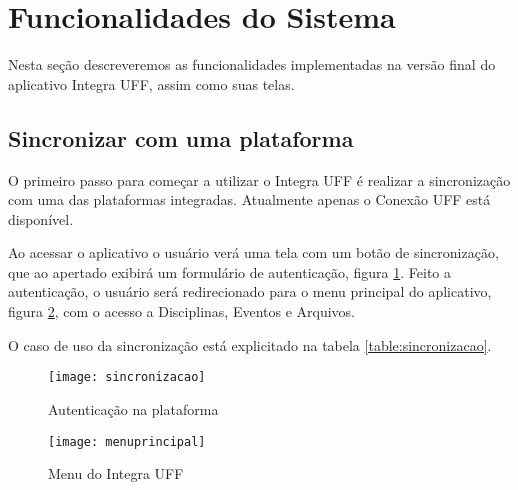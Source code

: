 \section{Funcionalidades do Sistema}

Nesta seção descreveremos as funcionalidades implementadas na versão final do aplicativo Integra UFF, assim como suas telas.

\subsection{Sincronizar com uma plataforma}

O primeiro passo para começar a utilizar o Integra UFF é realizar a sincronização com uma das plataformas integradas. Atualmente apenas o Conexão UFF está disponível. 

Ao acessar o aplicativo o usuário verá uma tela com um botão de sincronização, que ao apertado exibirá um formulário de autenticação, figura \ref{sincronizacao}. Feito a autenticação, o usuário será redirecionado para o menu principal do aplicativo, figura \ref{menuprincipal}, com o acesso a Disciplinas, Eventos e Arquivos. 

O caso de uso da sincronização está explicitado na tabela \ref{table:sincronizacao}.

\begin{figure}[H]
    \centering
\texttt{[image: sincronizacao]}
    \caption{Autenticação na plataforma}
    \label{sincronizacao}
\end{figure}

\begin{figure}[H]
    \centering
\texttt{[image: menuprincipal]}
    \caption{Menu do Integra UFF}
    \label{menuprincipal}
\end{figure}

